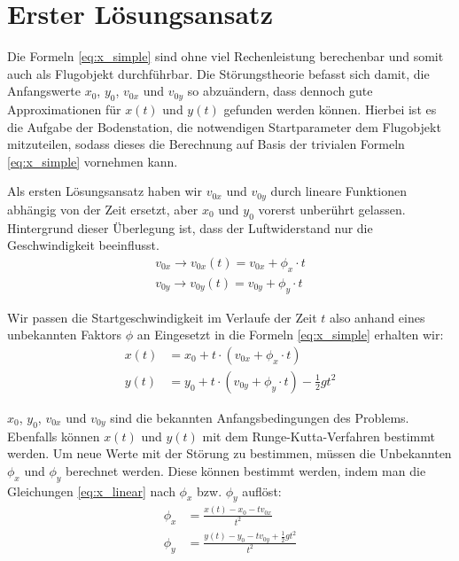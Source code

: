 \section{Erster Lösungsansatz
\label{perturbation:section:ersterloesungsansatz}}

Die Formeln \eqref{eq:x_simple} sind ohne viel Rechenleistung berechenbar und somit auch als Flugobjekt durchführbar.
Die Störungstheorie befasst sich damit, die Anfangswerte $x_0$, $y_0$, $v_{0x}$ und $v_{0y}$ so abzuändern,
dass dennoch gute Approximationen für $x(t)$ und $y(t)$ gefunden werden können.
Hierbei ist es die Aufgabe der Bodenstation, die notwendigen Startparameter dem Flugobjekt mitzuteilen,
sodass dieses die Berechnung auf Basis der trivialen Formeln \ref{eq:x_simple}  vornehmen kann.

Als ersten Lösungsansatz haben wir $v_{0x}$ und $v_{0y}$ durch lineare Funktionen abhängig von der Zeit ersetzt, aber $x_0$ und $y_0$ vorerst unberührt gelassen.
Hintergrund dieser Überlegung ist, dass der Luftwiderstand nur die Geschwindigkeit beeinflusst.
\begin{equation*}
	\begin{aligned}
		v_{0x} \rightarrow v_{0x}(t) = v_{0x} + \phi_x \cdot t\\
		v_{0y} \rightarrow v_{0y}(t) = v_{0y} + \phi_y \cdot t
	\end{aligned}
\end{equation*}



Wir passen die Startgeschwindigkeit im Verlaufe der Zeit $t$ also anhand eines unbekannten Faktors $\phi$ an
 Eingesetzt in die Formeln \eqref{eq:x_simple} erhalten wir:
\begin{equation}\label{eq:x_linear}
\begin{aligned}
    x(t) &= x_0 + t \cdot (v_{0x} + \phi_x \cdot t) \\
    y(t) &= y_0 + t \cdot (v_{0y} + \phi_y \cdot t) - \frac{1}{2}gt^2
\end{aligned}
\end{equation}

$x_0$, $y_0$, $v_{0x}$ und $v_{0y}$ sind die bekannten Anfangsbedingungen des Problems.
Ebenfalls können $x(t)$ und $y(t)$ mit dem Runge-Kutta-Verfahren bestimmt werden.
Um neue Werte mit der Störung zu bestimmen, müssen die Unbekannten $\phi_x$ und $\phi_y$ berechnet werden.
Diese können bestimmt werden, indem man die Gleichungen \eqref{eq:x_linear} nach $\phi_x$ bzw. $\phi_y$ auflöst:
\begin{equation}
	\begin{aligned}
	\phi_x &= \frac{x(t) - x_0 - tv_{0x}}{t^2}\\
	\phi_y &= \frac{y(t) - y_0 - tv_{0y} + \frac{1}{2}gt^2}{t^2}
	\end{aligned}
\end{equation}

